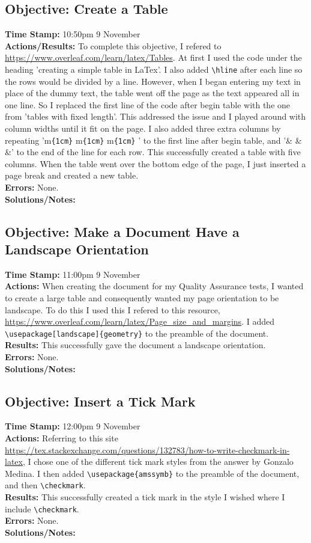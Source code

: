 \documentclass{article}
\begin{document}
\begin{FlushLeft}
\subsection{Objective: Create a Table}
\textbf{Time Stamp:} 10:50pm 9 November\\
\textbf{Actions/Results:} To complete this objective, I refered to \url{https://www.overleaf.com/learn/latex/Tables}. At first I used the code under the heading 'creating a simple table in LaTex'. I also added \verb|\hline| after each line so the rows would be divided by a line. However, when I began entering my text in place of the dummy text, the table went off the page as the text appeared all in one line. So I replaced the first line of the code after begin table with the one from 'tables with fixed length'. This addressed the issue and I played around with column widths until it fit on the page. I also added three extra columns by repeating 'm\verb|{1cm}| \textbar{} m\verb|{1cm}| \textbar{} m\verb|{1cm}| \textbar{}' to the first line after begin table, and '\& \& \&' to the end of the line for each row. This successfully created a table with five columns. When the table went over the bottom edge of the page, I just inserted a page break and created a new table.\\
\textbf{Errors:} None.\\
\textbf{Solutions/Notes:} 

\subsection{Objective: Make a Document Have a Landscape Orientation}
\textbf{Time Stamp:} 11:00pm 9 November\\
\textbf{Actions:} When creating the document for my Quality Assurance tests, I wanted to create a large table and consequently wanted my page orientation to be landscape. To do this I used this I refered to this resource, \url{https://www.overleaf.com/learn/latex/Page_size_and_margins}. I added \verb|\usepackage[landscape]{geometry}| to the preamble of the document. \\
\textbf{Results:} This successfully gave the document a landscape orientation.\\
\textbf{Errors:} None.\\
\textbf{Solutions/Notes:} 

\subsection{Objective: Insert a Tick Mark}
\textbf{Time Stamp:} 12:00pm 9 November\\
\textbf{Actions:} Referring to this site \url{https://tex.stackexchange.com/questions/132783/how-to-write-checkmark-in-latex}, I chose one of the different tick mark styles from the answer by Gonzalo Medina. I then added \verb|\usepackage{amssymb}| to the preamble of the document, and then \verb|\checkmark|.\\
\textbf{Results:} This successfully created a tick mark in the style I wished where I include \verb|\checkmark|.\\
\textbf{Errors:} None.\\
\textbf{Solutions/Notes:} 


\end{FlushLeft}
\end{document}
